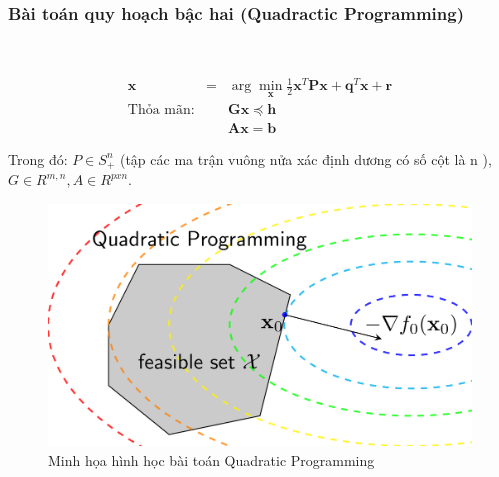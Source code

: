 \documentclass[a4paper, 12pt, oneside]{report}
\begin{document}
\subsubsection{Bài toán quy hoạch bậc hai (Quadractic Programming)}\\
\begin{mybox}
\begin{eqnarray}
\mathbf{x} &=& \arg\min_{\mathbf{x}} \frac{1}{2} \mathbf{x}^T\mathbf{P}\mathbf{x} + \mathbf{q}^T\mathbf{x} + \mathbf{r} \\
\text{Thỏa mãn:} &&\mathbf{Gx} \preceq \mathbf{h} \\
&& \mathbf{Ax} = \mathbf{b}
\end{eqnarray}
\end{mybox}
Trong đó: $P \in S^n_{+}$ (tập các ma trận vuông nửa xác định dương có số cột là n
), $G\in R^{m,n}, A \in R^{pxn}$.
\begin{center}
    \begin{figure}[H]
    \begin{center}
     \includegraphics[scale=0.2]{qp.png}
    \end{center}
    \caption{Minh họa hình học bài toán Quadratic Programming}
    \label{refhinh1}
    \end{figure}
\end{center}
\end{document}

